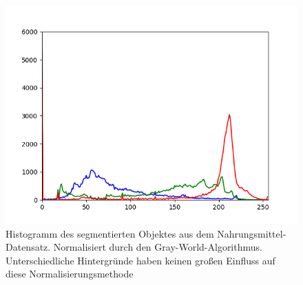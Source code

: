\begin{appendices}
\begin{figure}[htb]
\begin{minipage}[c]{0.08\textwidth}
\end{minipage}
\hfill
\begin{minipage}[c]{0.3\textwidth}
\includegraphics[width=\textwidth]{Sources/Bild3_GW_histo.png}
\end{minipage}
\caption{Histogramm des segmentierten Objektes aus dem Nahrungsmittel-Datensatz. Normalisiert durch den Gray-World-Algorithmus. Unterschiedliche Hintergründe haben keinen großen Einfluss auf diese Normalisierungsmethode}
\label{img:evalGW}
\end{figure}
\newpage

\end{appendices}
